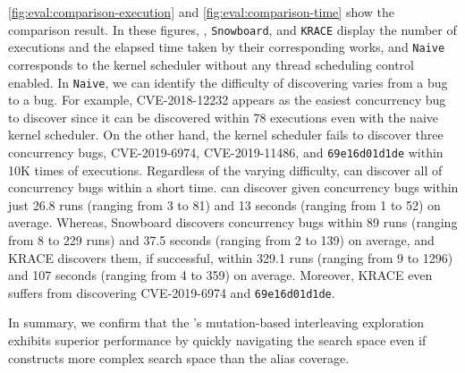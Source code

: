 


%
\autoref{fig:eval:comparison-execution} and
\autoref{fig:eval:comparison-time} show the comparison result.
%
In these figures, \texttt{\sys}, \texttt{Snowboard}, and
\texttt{KRACE} display the number of executions and the elapsed time
taken by their corresponding works, and \texttt{Naive} corresponds to
the kernel scheduler without any thread scheduling control enabled.
%
%
In \texttt{Naive}, we can identify the difficulty of discovering
varies from a bug to a bug.
%
For example, CVE-2018-12232 appears as the easiest concurrency bug to
discover since it can be discovered within 78 executions even with the naive kernel scheduler.
%
On the other hand, the kernel scheduler fails to discover three
concurrency bugs, CVE-2019-6974, CVE-2019-11486, and
\texttt{69e16d01d1de} within 10K times of executions.
%
Regardless of the varying difficulty, \sys can discover all of
concurrency bugs within a short time.
%
\sys can discover given concurrency bugs within just 26.8 runs
(ranging from 3 to 81) and 13 seconds (ranging from 1 to 52) on
average.
%
Whereas, Snowboard discovers concurrency bugs within 89 runs (ranging
from 8 to 229 runs) and 37.5 seconds (ranging from 2 to 139) on
average, and KRACE discovers them, if successful, within 329.1 runs
(ranging from 9 to 1296) and 107 seconds (ranging from 4 to 359) on
average.  Moreover, KRACE even suffers from discovering CVE-2019-6974
and \texttt{69e16d01d1de}.

In summary, we confirm that the \sys's mutation-based 
interleaving exploration exhibits superior performance by 
quickly navigating the search space even if \intcov 
constructs more complex search space than the alias coverage.

